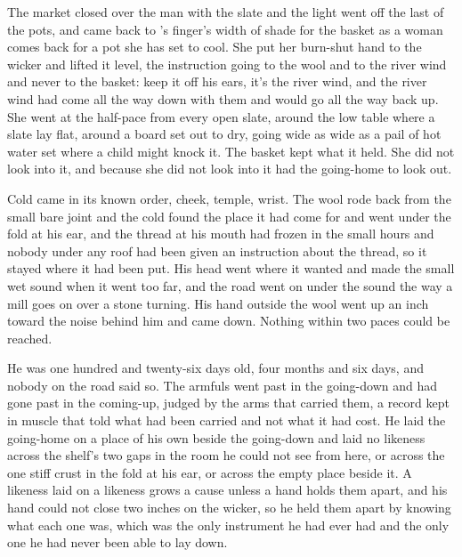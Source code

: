 The market closed over the man with the slate and the light went off the last of the pots, and  came back to 's finger's width of shade for the basket as a woman comes back for a pot she has set to cool. She put her burn-shut hand to the wicker and lifted it level, the instruction going to the wool and to the river wind and never to the basket: keep it off his ears, it's the river wind, and the river wind had come all the way down with them and would go all the way back up. She went at the half-pace from every open slate, around the low table where a slate lay flat, around a board set out to dry, going wide as wide as a pail of hot water set where a child might knock it. The basket kept what it held. She did not look into it, and because she did not look into it  had the going-home to look out.

Cold came in its known order, cheek, temple, wrist. The wool rode back from the small bare joint and the cold found the place it had come for and went under the fold at his ear, and the thread at his mouth had frozen in the small hours and nobody under any roof had been given an instruction about the thread, so it stayed where it had been put. His head went where it wanted and made the small wet sound when it went too far, and the road went on under the sound the way a mill goes on over a stone turning. His hand outside the wool went up an inch toward the noise behind him and came down. Nothing within two paces could be reached.

He was one hundred and twenty-six days old, four months and six days, and nobody on the road said so. The armfuls went past in the going-down and had gone past in the coming-up, judged by the arms that carried them, a record kept in muscle that told what had been carried and not what it had cost. He laid the going-home on a place of his own beside the going-down and laid no likeness across the shelf's two gaps in the room he could not see from here, or across the one stiff crust in the fold at his ear, or across the empty place beside it. A likeness laid on a likeness grows a cause unless a hand holds them apart, and his hand could not close two inches on the wicker, so he held them apart by knowing what each one was, which was the only instrument he had ever had and the only one he had never been able to lay down.

